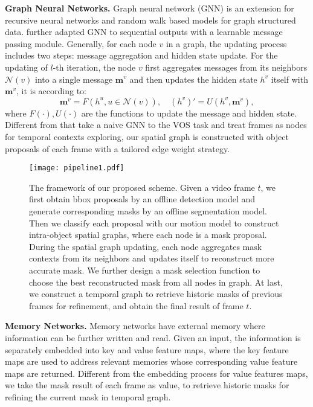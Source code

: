 \documentclass[letterpaper]{article} \usepackage{aaai21}  \usepackage{times}  \usepackage{helvet} \usepackage{courier}  \usepackage[hyphens]{url}  \usepackage{graphicx} \urlstyle{rm} \def\UrlFont{\rm}  \usepackage{graphicx}  \usepackage{natbib}  \usepackage{caption} \frenchspacing  \setlength{\pdfpagewidth}{8.5in}  \setlength{\pdfpageheight}{11in}  \usepackage{amsmath}
\begin{document}
\noindent \textbf{Graph Neural Networks.}
Graph neural network (GNN) \cite{scarselli2008graph} is an extension for recursive neural networks and random walk based models for graph structured data. \cite{gilmer2017neural,li2018deeper} further adapted GNN to sequential outputs with a learnable message passing module.
Generally, for each node $v$ in a graph, the updating process includes two steps: message aggregation and hidden state update. For the updating of $l$-th iteration, the node $v$ first aggregates messages from its neighbors $\mathcal{N}(v)$ into a single message $\bm{m}^v$ and then updates the hidden state $h^v$ itself with $\bm{m}^v$, it is according to:
\begin{equation}
    \bm{m}^v=F(h^u, u\in \mathcal{N}(v)), \quad (h^v){'}=U(h^v, \bm{m}^v),
\end{equation}
where $F(\cdot),U(\cdot)$ are the functions to update the message and hidden state. 
Different from \cite{haller2019spacetime,wang2019zero} that take a naive GNN to the VOS task and treat frames as nodes for temporal contexts exploring, our spatial graph is constructed with object proposals of each frame with a tailored edge weight strategy.

\begin{figure*}[t]
\centering
\texttt{[image: pipeline1.pdf]}
\caption{The framework of our proposed scheme. Given a video frame $t$, we first obtain bbox proposals by an offline detection model and generate corresponding masks by an offline segmentation model. Then we classify each proposal with our motion model to construct intra-object spatial graphs, where each node is a mask proposal. During the spatial graph updating, each node aggregates mask contexts from its neighbors and updates itself to reconstruct more accurate mask. We further design a mask selection function to choose the best reconstructed mask from all nodes in graph. At last, we construct a temporal graph to retrieve historic masks of previous frames for refinement, and obtain the final result of frame $t$.}
\label{fig:pipeline}
\vspace{-10pt}
\end{figure*}

\noindent \textbf{Memory Networks.}
Memory networks \cite{vaswani2017attention,sukhbaatar2015end} have external memory where information can be further written and read. Given an input, the information is separately embedded into key and value feature maps, where the key feature maps are used to address relevant memories whose corresponding value feature maps are returned. 
Different from the embedding process \cite{oh2019video,lu2020video} for value features maps, we take the mask result of each frame as value, to retrieve historic masks for refining the current mask in temporal graph.
\end{document}
